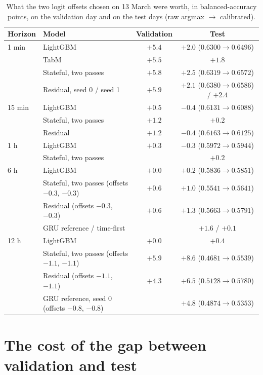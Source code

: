 \begin{table}[t]
\centering
\caption{What the two logit offsets chosen on 13 March were worth, in balanced-accuracy
points, on the validation day and on the test days (raw argmax $\to$ calibrated).}
\label{tab:app:offsets}
\small
\begin{fittable}\begin{tabular}{llcc}
\toprule
Horizon & Model & Validation & Test \\
\midrule
1 min  & LightGBM & $+5.4$ & $+2.0$ ($0.6300 \to 0.6496$) \\
       & TabM & $+5.5$ & $+1.8$ \\
       & Stateful, two passes & $+5.8$ & $+2.5$ ($0.6319 \to 0.6572$) \\
       & Residual, seed 0 / seed 1 & $+5.9$ & $+2.1$ ($0.6380 \to 0.6586$) / $+2.4$ \\
15 min & LightGBM & $+0.5$ & $-0.4$ ($0.6131 \to 0.6088$) \\
       & Stateful, two passes & $+1.2$ & $+0.2$ \\
       & Residual & $+1.2$ & $-0.4$ ($0.6163 \to 0.6125$) \\
1 h    & LightGBM & $+0.3$ & $-0.3$ ($0.5972 \to 0.5944$) \\
       & Stateful, two passes & & $+0.2$ \\
6 h    & LightGBM & $+0.0$ & $+0.2$ ($0.5836 \to 0.5851$) \\
       & Stateful, two passes (offsets $-0.3$, $-0.3$) & $+0.6$ & $+1.0$ ($0.5541 \to 0.5641$) \\
       & Residual (offsets $-0.3$, $-0.3$) & $+0.6$ & $+1.3$ ($0.5663 \to 0.5791$) \\
       & GRU reference / time-first & & $+1.6$ / $+0.1$ \\
12 h   & LightGBM & $+0.0$ & $+0.4$ \\
       & Stateful, two passes (offsets $-1.1$, $-1.1$) & $+5.9$ & $+8.6$ ($0.4681 \to 0.5539$) \\
       & Residual (offsets $-1.1$, $-1.1$) & $+4.3$ & $+6.5$ ($0.5128 \to 0.5780$) \\
       & GRU reference, seed 0 (offsets $-0.8$, $-0.8$) & & $+4.8$ ($0.4874 \to 0.5353$) \\
\bottomrule
\end{tabular}\end{fittable}
\end{table}

\section{The cost of the gap between validation and test}
\label{app:results:lag}

